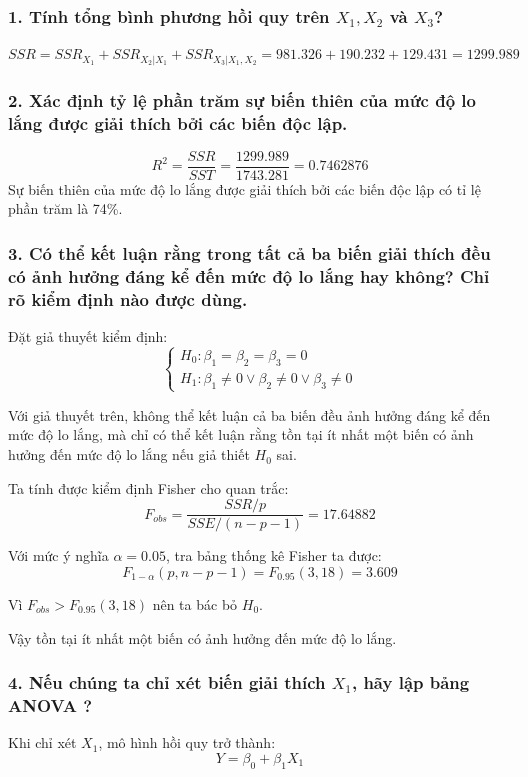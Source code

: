 \documentclass[a4paper]{article}
\theoremstyle{nonumberplain}
\begin{document}
\subsubsection*{1. Tính tổng bình phương hồi quy trên $X_1, X_2$ và $X_3$?}
$SSR = SSR_{X_1} + SSR_{X_2|X_1} + SSR_{X_3|X_1,X_2} = 981.326 + 190.232 + 129.431 = 1299.989$
\subsubsection*{2. Xác định tỷ lệ phần trăm sự biến thiên của mức độ lo lắng được giải thích bởi các biến độc lập.}
\[R^2 = \dfrac{SSR}{SST} = \dfrac{1299.989}{1743.281} = 0.7462876\]
Sự biến thiên của mức độ lo lắng được giải thích bởi các biến độc lập có tỉ lệ phần trăm là 74\%.

\subsubsection*{3. Có thể kết luận rằng trong tất cả ba biến giải thích đều có ảnh hưởng đáng kể đến mức độ lo lắng hay không? Chỉ rõ kiểm định nào được dùng.}

Đặt giả thuyết kiểm định:
\[\begin{cases}
	H_0: \beta_1 = \beta_2 = \beta_3 = 0\\
	H_1: \beta_1 \neq 0 \vee \beta_2 \neq 0 \vee \beta_3 \neq 0
\end{cases}\]

Với giả thuyết trên, không thể kết luận cả ba biến đều ảnh hưởng đáng kể đến mức độ lo lắng, mà chỉ có thể kết luận rằng tồn tại ít nhất một biến có ảnh hưởng đến mức độ lo lắng nếu giả thiết $H_0$ sai.

Ta tính được kiểm định Fisher cho quan trắc:
\[F_{obs} = \dfrac{SSR/p}{SSE/(n-p-1)} = 17.64882\]

Với mức ý nghĩa $\alpha = 0.05$, tra bảng thống kê Fisher ta được:
\[F_{1-\alpha}(p,n-p-1) = F_{0.95}(3,18) = 3.609\]

Vì $F_{obs} > F_{0.95}(3,18)$ nên ta bác bỏ $H_0$.

Vậy tồn tại ít nhất một biến có ảnh hưởng đến mức độ lo lắng.

\subsubsection*{4. Nếu chúng ta chỉ xét biến giải thích $X_1$, hãy lập bảng ANOVA ?}

Khi chỉ xét $X_1$, mô hình hồi quy trở thành:
\[Y = \beta_0 + \beta_1X_1\]
\end{document}
